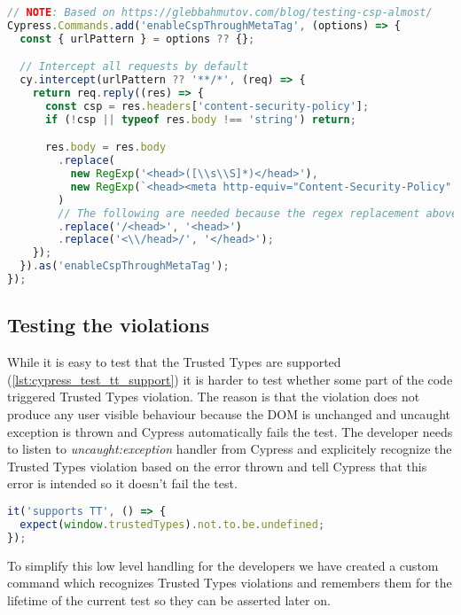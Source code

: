 \bigskip
\begin{lstlisting}[language=JavaScript, caption=Intercept requests and enable CSP header inside via meta tag]
// NOTE: Based on https://glebbahmutov.com/blog/testing-csp-almost/
Cypress.Commands.add('enableCspThroughMetaTag', (options) => {
  const { urlPattern } = options ?? {};

  // Intercept all requests by default
  cy.intercept(urlPattern ?? '**/*', (req) => {
    return req.reply((res) => {
      const csp = res.headers['content-security-policy'];
      if (!csp || typeof res.body !== 'string') return;

      res.body = res.body
        .replace(
          new RegExp('<head>([\\s\\S]*)</head>'),
          new RegExp(`<head><meta http-equiv="Content-Security-Policy" content="${csp}">$1</head>`).toString()
        )
        // The following are needed because the regex replacement above inserts some characters
        .replace('/<head>', '<head>')
        .replace('<\\/head>/', '</head>');
    });
  }).as('enableCspThroughMetaTag');
});
\end{lstlisting}

\subsection{Testing the violations}

While it is easy to test that the Trusted Types are supported (\ref{lst:cypress_test_tt_support}) it
is harder to test whether some part of the code triggered Trusted Types violation. The reason is
that the violation does not produce any user visible behaviour because the DOM is unchanged and
uncaught exception is thrown and Cypress automatically fails the test. The developer needs to listen
to \textit{uncaught:exception} handler from Cypress and explicitely recognize the Trusted Types
violation based on the error thrown and tell Cypress that this error is intended so it doesn't fail
the test.

\bigskip
\begin{lstlisting}[language=JavaScript, caption=Test Trusted Types support, label={lst:cypress_test_tt_support}]
it('supports TT', () => {
  expect(window.trustedTypes).not.to.be.undefined;
});
\end{lstlisting}

To simplify this low level handling for the developers we have created a custom command which
recognizes Trusted Types violations and remembers them for the lifetime of the current test so they
can be asserted later on.

